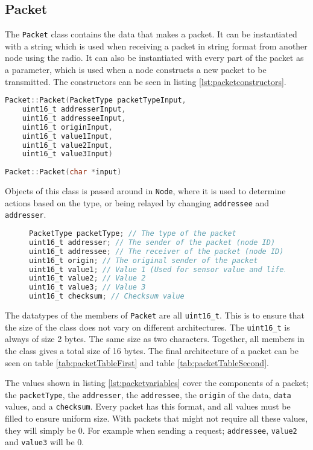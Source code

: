 \subsection{Packet}
The \texttt{Packet} class contains the data that makes a packet. It can be instantiated with a string which is used when receiving a packet in string format from another node using the radio. It can also be instantiated with every part of the packet as a parameter, which is used when a node constructs a new packet to be transmitted. The constructors can be seen in listing \ref{lst:packetconstructors}.
\begin{lstlisting}[language=C,label={lst:packetconstructors},caption={Packet constructors}]
Packet::Packet(PacketType packetTypeInput, 
    uint16_t addresserInput, 
    uint16_t addresseeInput, 
    uint16_t originInput, 
    uint16_t value1Input,
    uint16_t value2Input, 
    uint16_t value3Input)
	
Packet::Packet(char *input)
\end{lstlisting}

Objects of this class is passed around in \texttt{Node}, where it is used to determine actions based on the type, or being relayed by changing \texttt{addressee} and \texttt{addresser}.

\begin{figure}
\begin{lstlisting}[language=C,label={lst:packetvariables},caption={Packet variables}]
PacketType packetType; // The type of the packet
uint16_t addresser; // The sender of the packet (node ID)
uint16_t addressee; // The receiver of the packet (node ID)
uint16_t origin; // The original sender of the packet
uint16_t value1; // Value 1 (Used for sensor value and lifespan)
uint16_t value2; // Value 2
uint16_t value3; // Value 3
uint16_t checksum; // Checksum value
\end{lstlisting}
\end{figure}
The datatypes of the members of \texttt{Packet} are all \texttt{uint16\_t}. This is to ensure that the size of the class does not vary on different architectures. The \texttt{uint16\_t} is always of size 2 bytes. The same size as two characters. Together, all members in the class gives a total size of 16 bytes. The final architecture of a packet can be seen on table \ref{tab:packetTableFirst} and table \ref{tab:packetTableSecond}.

The values shown in listing \ref{lst:packetvariables} cover the components of a packet; the \texttt{packetType}, the \texttt{addresser}, the \texttt{addressee}, the \texttt{origin} of the data, \texttt{data} values, and a \texttt{checksum}.
Every packet has this format, and all values must be filled to ensure uniform size. With packets that might not require all these values, they will simply be 0. For example when sending a request; \texttt{addressee}, \texttt{value2} and \texttt{value3} will be 0.

